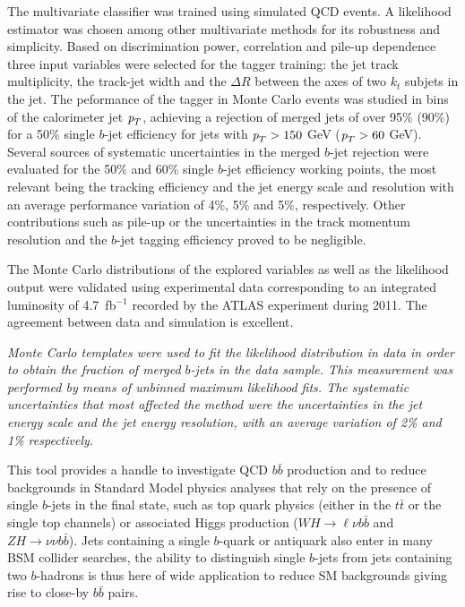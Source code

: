 The multivariate classifier was trained using simulated QCD events. A likelihood estimator was chosen among other multivariate methods for its robustness and simplicity.  Based on discrimination power, correlation and pile-up dependence three input variables were selected for the tagger training: the jet track multiplicity, the track-jet width and the $\Delta R$ between the axes of two $k_t$ subjets in the jet. 
 The peformance of the tagger in Monte Carlo events was studied in bins of the calorimeter jet ${\emph{p}_{T}}$, achieving a rejection of merged jets of over 95\% (90\%) for a 50\% single $b$-jet efficiency for jets with ${\emph{p}_{T}}>150$ GeV (${\emph{p}_{T}}>60$ GeV).
Several sources of systematic uncertainties in the merged $b$-jet rejection were evaluated for the 50\% and 60\% single $b$-jet efficiency working points, the most relevant being the tracking efficiency and the jet energy scale and resolution with an average performance variation of 4\%, 5\% and 5\%, respectively. Other contributions such as pile-up or the uncertainties in the track momentum resolution and the $b$-jet tagging efficiency proved to be negligible.


The Monte Carlo distributions of the explored variables as well as the likelihood output were validated using experimental data corresponding to an integrated luminosity of 4.7~fb$^{-1}$ recorded by the ATLAS experiment during 2011. The agreement between data and simulation is excellent.

\emph{Monte Carlo templates were used to fit the likelihood distribution in data in order to obtain the fraction of merged $b$-jets in the data sample. This measurement was performed by means of unbinned maximum likelihood fits. The systematic uncertainties that most affected the method were the uncertainties in the jet energy scale and the jet energy resolution, with an average variation of 2\% and 1\% respectively.}


This tool provides a handle to investigate QCD $b\bar{b}$ production and to reduce backgrounds in %
 Standard Model physics analyses that rely on the presence of single $b$-jets in the final state, such as top quark physics (either in the $t\bar{t}$ or the single top channels) or associated Higgs production ($WH\rightarrow\ell\nu b\bar{b}$ and $ZH\rightarrow\nu\nu b\bar{b}$). %
 Jets containing a single $b$-quark or antiquark %
also enter in many BSM collider searches, the ability to distinguish single $b$-jets from jets containing two $b$-hadrons is thus here of wide application to reduce SM backgrounds giving rise to close-by $b\bar{b}$ pairs.

